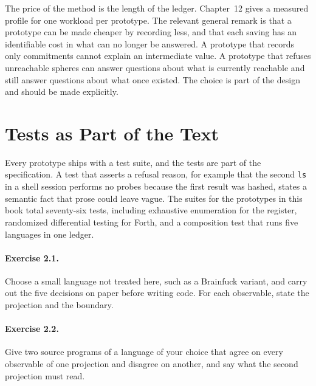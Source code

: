 The price of the method is the length of the ledger. Chapter~12 gives a measured profile for one workload per prototype. The relevant general remark is that a prototype can be made cheaper by recording less, and that each saving has an identifiable cost in what can no longer be answered. A prototype that records only commitments cannot explain an intermediate value. A prototype that refuses unreachable spheres can answer questions about what is currently reachable and still answer questions about what once existed. The choice is part of the design and should be made explicitly.

\section{Tests as Part of the Text}

Every prototype ships with a test suite, and the tests are part of the specification. A test that asserts a refusal reason, for example that the second \texttt{ls} in a shell session performs no probes because the first result was hashed, states a semantic fact that prose could leave vague. The suites for the prototypes in this book total seventy-six tests, including exhaustive enumeration for the register, randomized differential testing for Forth, and a composition test that runs five languages in one ledger.

\paragraph{Exercise 2.1.} Choose a small language not treated here, such as a Brainfuck variant, and carry out the five decisions on paper before writing code. For each observable, state the projection and the boundary.

\paragraph{Exercise 2.2.} Give two source programs of a language of your choice that agree on every observable of one projection and disagree on another, and say what the second projection must read.

